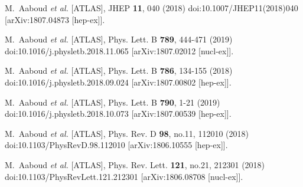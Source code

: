 \begin{thebibliography}{9}
M.~Aaboud \textit{et al.} [ATLAS],
JHEP \textbf{11}, 040 (2018)
doi:10.1007/JHEP11(2018)040
[arXiv:1807.04873 [hep-ex]].

M.~Aaboud \textit{et al.} [ATLAS],
Phys. Lett. B \textbf{789}, 444-471 (2019)
doi:10.1016/j.physletb.2018.11.065
[arXiv:1807.02012 [nucl-ex]].

M.~Aaboud \textit{et al.} [ATLAS],
Phys. Lett. B \textbf{786}, 134-155 (2018)
doi:10.1016/j.physletb.2018.09.024
[arXiv:1807.00802 [hep-ex]].

M.~Aaboud \textit{et al.} [ATLAS],
Phys. Lett. B \textbf{790}, 1-21 (2019)
doi:10.1016/j.physletb.2018.10.073
[arXiv:1807.00539 [hep-ex]].

M.~Aaboud \textit{et al.} [ATLAS],
Phys. Rev. D \textbf{98}, no.11, 112010 (2018)
doi:10.1103/PhysRevD.98.112010
[arXiv:1806.10555 [hep-ex]].

M.~Aaboud \textit{et al.} [ATLAS],
Phys. Rev. Lett. \textbf{121}, no.21, 212301 (2018)
doi:10.1103/PhysRevLett.121.212301
[arXiv:1806.08708 [nucl-ex]].


\end{thebibliography}
